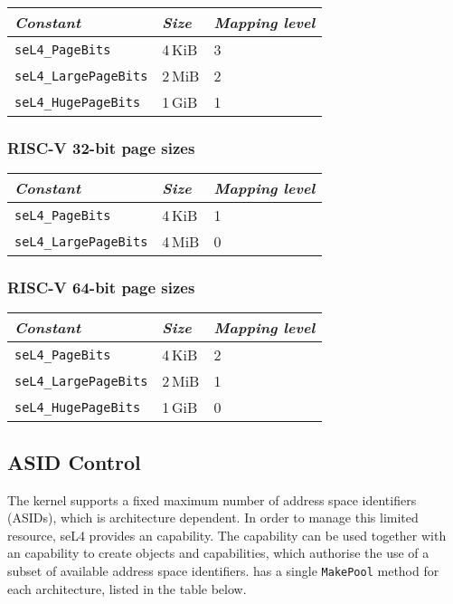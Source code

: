 \begin{tabularx}{\textwidth}{Xll} \toprule
    \emph{Constant}             & \emph{Size} & \emph{Mapping level} \\ \midrule
    \texttt{seL4\_PageBits}      & 4\,KiB      & 3                   \\
    \texttt{seL4\_LargePageBits} & 2\,MiB      & 2                   \\
    \texttt{seL4\_HugePageBits}  & 1\,GiB      & 1                   \\
    \bottomrule
\end{tabularx}

\subsubsection{RISC-V 32-bit page sizes}

\begin{tabularx}{\textwidth}{Xll} \toprule
    \emph{Constant}             & \emph{Size} & \emph{Mapping level} \\ \midrule
    \texttt{seL4\_PageBits}      & 4\,KiB      & 1                   \\
    \texttt{seL4\_LargePageBits} & 4\,MiB      & 0                   \\
    \bottomrule
\end{tabularx}

\subsubsection{RISC-V 64-bit page sizes}

\begin{tabularx}{\textwidth}{Xll} \toprule
    \emph{Constant}             & \emph{Size} & \emph{Mapping level} \\ \midrule
    \texttt{seL4\_PageBits}      & 4\,KiB      & 2                   \\
    \texttt{seL4\_LargePageBits} & 2\,MiB      & 1                   \\
    \texttt{seL4\_HugePageBits}  & 1\,GiB      & 0                   \\
    \bottomrule
\end{tabularx}

\subsection{ASID Control}

The kernel supports a fixed maximum number of address space identifiers (ASIDs), which is
architecture dependent. In order to manage this limited resource, seL4 provides an  capability. The  capability can be used together with an 
capability to create  objects and capabilities, which authorise the use of a subset
of available address space identifiers.  has a single \texttt{MakePool} method for
each architecture, listed in the table below.

